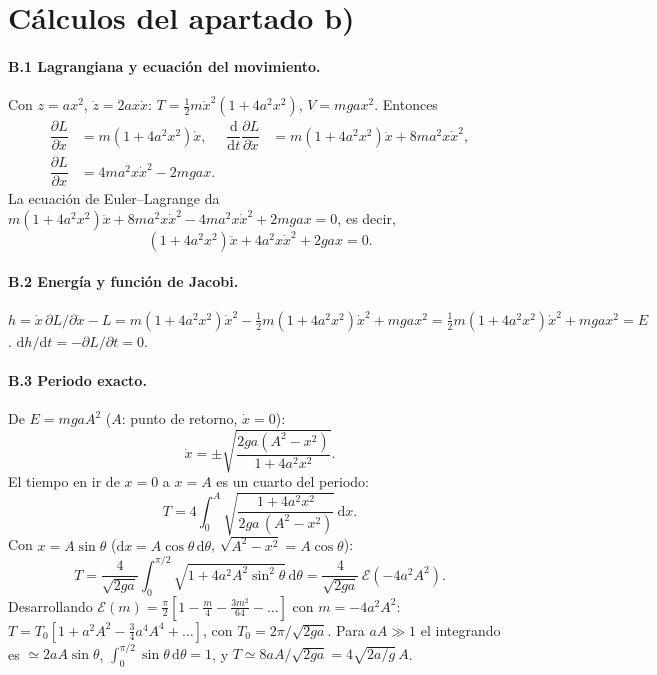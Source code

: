 \documentclass[11pt,a4paper]{article}
\newcommand{\dd}{\mathrm{d}}
\newcommand{\pd}[2]{\dfrac{\partial #1}{\partial #2}}
\newcommand{\ddt}[1]{\dfrac{\dd #1}{\dd t}}
\begin{document}
\section{Cálculos del apartado b)}\label{app:b}
\paragraph{B.1 Lagrangiana y ecuación del movimiento.}
Con $z=ax^2$, $\dot z=2ax\dot x$: $T=\tfrac12m\dot x^2(1+4a^2x^2)$, $V=mgax^2$. Entonces
\begin{align}
 \pd{L}{\dot x}&=m(1+4a^2x^2)\dot x,&
 \ddt{}\!\pd{L}{\dot x}&=m(1+4a^2x^2)\ddot x+8ma^2x\dot x^2,\\
 \pd{L}{x}&=4ma^2x\dot x^2-2mgax .
\end{align}
La ecuación de Euler--Lagrange da $m(1+4a^2x^2)\ddot x+8ma^2x\dot x^2-4ma^2x\dot x^2+2mgax=0$, es decir,
\begin{equation}
 (1+4a^2x^2)\ddot x+4a^2x\dot x^2+2gax=0.
\end{equation}

\paragraph{B.2 Energía y función de Jacobi.}
$h=\dot x\,\partial L/\partial\dot x-L=m(1+4a^2x^2)\dot x^2-\tfrac12m(1+4a^2x^2)\dot x^2+mgax^2=\tfrac12m(1+4a^2x^2)\dot x^2+mgax^2=E$.
$\dd h/\dd t=-\partial L/\partial t=0$.

\paragraph{B.3 Periodo exacto.}
De $E=mgaA^2$ ($A$: punto de retorno, $\dot x=0$):
\begin{equation}
 \dot x=\pm\sqrt{\frac{2ga(A^2-x^2)}{1+4a^2x^2}} .
\end{equation}
El tiempo en ir de $x=0$ a $x=A$ es un cuarto del periodo:
\begin{equation}
 T=4\int_0^A\sqrt{\frac{1+4a^2x^2}{2ga\,(A^2-x^2)}}\,\dd x .
\end{equation}
Con $x=A\sin\theta$ ($\dd x=A\cos\theta\,\dd\theta$, $\sqrt{A^2-x^2}=A\cos\theta$):
\begin{equation}
 T=\frac{4}{\sqrt{2ga}}\int_0^{\pi/2}\sqrt{1+4a^2A^2\sin^2\theta}\,\dd\theta=\frac{4}{\sqrt{2ga}}\,\mathcal E(-4a^2A^2).
\end{equation}
Desarrollando $\mathcal E(m)=\frac\pi2\left[1-\frac m4-\frac{3m^2}{64}-\dots\right]$ con $m=-4a^2A^2$:
$T=T_0\left[1+a^2A^2-\tfrac34a^4A^4+\dots\right]$, con $T_0=2\pi/\sqrt{2ga}$. Para $aA\gg1$ el integrando es $\simeq2aA\sin\theta$, $\int_0^{\pi/2}\sin\theta\,\dd\theta=1$,
y $T\simeq8aA/\sqrt{2ga}=4\sqrt{2a/g}\,A$.
\end{document}
